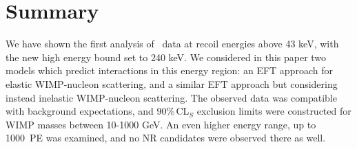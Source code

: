 \section{Summary}
We have shown the first analysis of \Xehund\ data at recoil energies above 43 keV, with the new high energy bound set to 240 keV. We considered in this paper two models which predict interactions in this energy region: an EFT approach for elastic WIMP-nucleon scattering, and a similar EFT approach but considering instead inelastic WIMP-nucleon scattering. The observed data was compatible with background expectations, and 90\%\,CL$_S$ exclusion limits were constructed for WIMP masses between 10-1000 GeV. An even higher energy range, up to 1000~PE was examined, and no NR candidates were observed there as well. 
